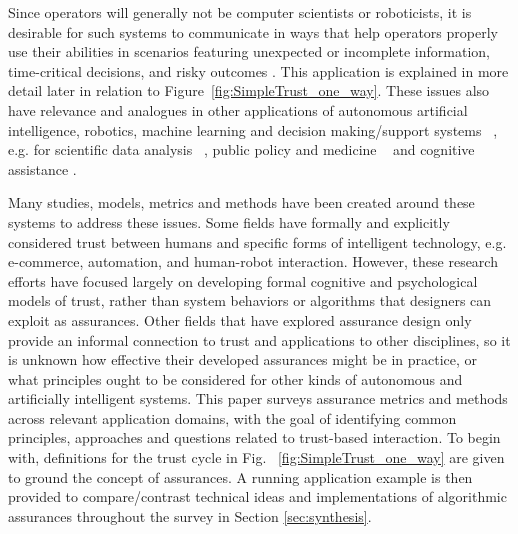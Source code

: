     Since operators will generally not be computer scientists or roboticists, it is desirable for such systems to communicate in ways that help operators properly use their abilities in scenarios featuring unexpected or incomplete information, time-critical decisions, and risky outcomes \cite{Hutchins2015-if, Sweet2016-tz}. 
    This application is explained in more detail later in relation to Figure~\ref{fig:SimpleTrust_one_way}. 
    These issues also have relevance and analogues in other applications of autonomous artificial intelligence, robotics, machine learning and decision making/support systems ~\cite{Garcia2015-rs,Otte2013-oo,Sugiyama2013-ci,Amodei2016-xi}, e.g. for scientific data analysis ~\cite{Faghmous2014-og}, public policy and medicine ~\cite{Wagner2016-ck,Jovanovic2016-gw} and cognitive assistance \cite{Gutfreund2016-xe}.
    
    Many studies, models, metrics and methods have been created around these systems to address these issues. 
    Some fields have formally and explicitly considered trust between humans and specific forms of intelligent technology, e.g. e-commerce, automation, and human-robot interaction. However, these research efforts have focused largely on developing formal cognitive and psychological models of trust, rather than system behaviors or algorithms that designers can exploit as assurances. %
    Other fields that have explored assurance design only provide an informal connection to trust and applications to other disciplines, so it is unknown how effective their developed assurances might be in practice, or what principles ought to be considered for other kinds of autonomous and artificially intelligent systems. 
    This paper surveys assurance metrics and methods across relevant application domains, with the goal of %
    identifying common principles, approaches and questions related to trust-based interaction. %
    To begin with, definitions for the trust cycle in Fig. ~\ref{fig:SimpleTrust_one_way} are given to ground the concept of assurances. A running application example is then provided to compare/contrast technical ideas and implementations of algorithmic assurances throughout the survey in Section \ref{sec:synthesis}. 
     
